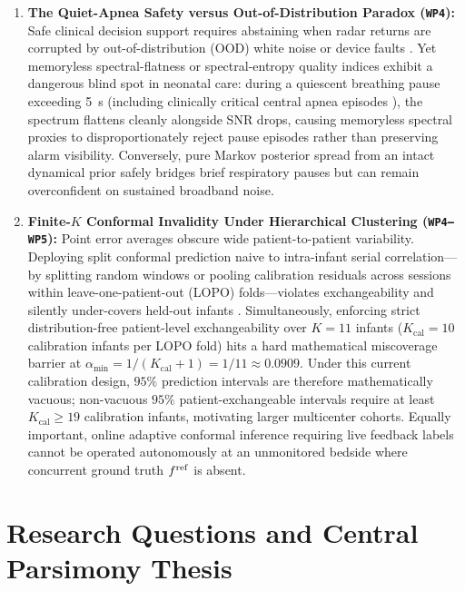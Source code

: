 \begin{enumerate}
  \item \textbf{The Quiet-Apnea Safety versus Out-of-Distribution Paradox (\texttt{WP4}):}
    Safe clinical decision support requires abstaining when radar returns are corrupted by
    out-of-distribution (OOD) white noise or device faults \citep{orphanidou2015signal,geifman2017selective,traub2024overcoming}.
    Yet memoryless spectral-flatness or spectral-entropy quality indices exhibit a dangerous blind
    spot in neonatal care: during a quiescent breathing pause exceeding \SI{5}{\second} (including
    clinically critical central apnea episodes \citep{krbec2024emerging}), the
    spectrum flattens cleanly alongside SNR drops, causing memoryless spectral proxies to
    disproportionately reject pause episodes rather than preserving alarm visibility.
    Conversely, pure Markov posterior spread from an intact dynamical prior
    safely bridges brief respiratory pauses but can remain overconfident on sustained broadband noise.

  \item \textbf{Finite-$K$ Conformal Invalidity Under Hierarchical Clustering (\texttt{WP4--WP5}):}
    Point error averages obscure wide patient-to-patient variability. Deploying split conformal
    prediction naive to intra-infant serial correlation---by splitting random windows or pooling
    calibration residuals across sessions within leave-one-patient-out (LOPO) folds---violates
    exchangeability and silently under-covers held-out infants \citep{dunn2023distribution,barber2023conformal}.
    Simultaneously, enforcing strict distribution-free patient-level exchangeability over $K=11$
    infants ($K_{\mathrm{cal}}=10$ calibration infants per LOPO fold) hits a hard mathematical
    miscoverage barrier at $\alpha_{\min} = 1/(K_{\mathrm{cal}}+1) = 1/11 \approx 0.0909$. Under
    this current calibration design, $95\%$ prediction intervals are therefore mathematically
    vacuous; non-vacuous $95\%$ patient-exchangeable intervals require at least $K_{\mathrm{cal}}\geq19$
    calibration infants, motivating larger multicenter cohorts.
    Equally important, online adaptive conformal inference requiring live feedback labels
    \citep{gibbs2024conformal} cannot be operated autonomously at an unmonitored bedside where
    concurrent ground truth $f^{\mathrm{ref}}$ is absent.
\end{enumerate}

\section{Research Questions and Central Parsimony Thesis}
\label{sec:ch1_rqs}

